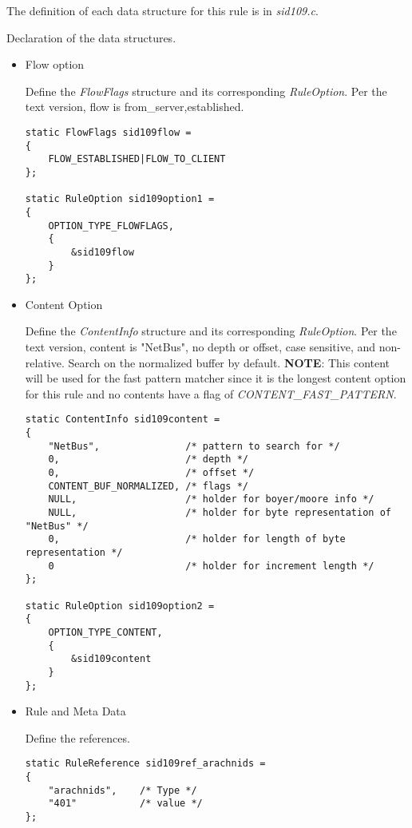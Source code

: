 \documentclass[english]{report}
\begin{document}
The definition of each data structure for this rule is in 
{\em sid109.c}.

Declaration of the data structures.

\begin{itemize}

\item{Flow option}

Define the {\em FlowFlags} structure and its corresponding {\em RuleOption}.
Per the text version, flow is from\_server,established.

\begin{verbatim}
static FlowFlags sid109flow =
{
    FLOW_ESTABLISHED|FLOW_TO_CLIENT
};

static RuleOption sid109option1 =
{
    OPTION_TYPE_FLOWFLAGS,
    {
        &sid109flow
    }
};
\end{verbatim}

\item{Content Option}

Define the {\em ContentInfo} structure and its corresponding {\em RuleOption}.
Per the text version, content is "NetBus", no depth or offset, case sensitive,
and non-relative.  Search on the normalized buffer by default.  {\bf NOTE}:
This content will be used for the fast pattern matcher since it is the
longest content option for this rule and no contents have a flag of {\em
CONTENT\_FAST\_PATTERN}.

\begin{verbatim}
static ContentInfo sid109content =
{
    "NetBus",               /* pattern to search for */
    0,                      /* depth */
    0,                      /* offset */
    CONTENT_BUF_NORMALIZED, /* flags */
    NULL,                   /* holder for boyer/moore info */
    NULL,                   /* holder for byte representation of "NetBus" */
    0,                      /* holder for length of byte representation */
    0                       /* holder for increment length */
};

static RuleOption sid109option2 =
{
    OPTION_TYPE_CONTENT,
    {
        &sid109content
    }
};
\end{verbatim}

\item{Rule and Meta Data}

Define the references.

\begin{verbatim}
static RuleReference sid109ref_arachnids =
{
    "arachnids",    /* Type */
    "401"           /* value */
};


\end{verbatim}
\end{itemize}
\end{document}
